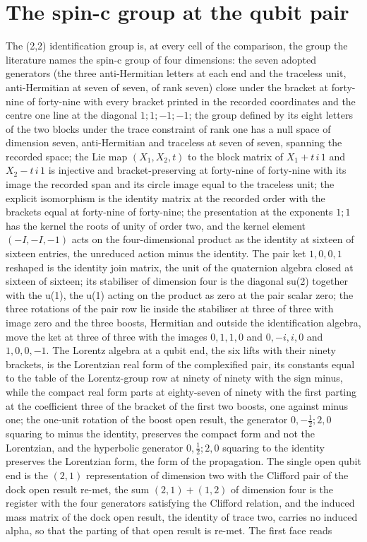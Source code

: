 \section{The spin-c group at the qubit pair}\label{mod:III-5-D542908-spcf-t1}
\begin{chtheorem}\label{box:III-5-D542908-spcf-t1:1}
The (2,2) identification group is, at every cell of the comparison, the group the literature names the spin-c group of four dimensions: the seven adopted generators (the three anti-Hermitian letters at each end and the traceless unit, anti-Hermitian at seven of seven, of rank seven) close under the bracket at forty-nine of forty-nine with every bracket printed in the recorded coordinates and the centre one line at the diagonal $1;1;-1;-1$; the group defined by its eight letters of the two blocks under the trace constraint of rank one has a null space of dimension seven, anti-Hermitian and traceless at seven of seven, spanning the recorded space; the Lie map $(X_{1}, X_{2}, t)$ to the block matrix of $X_{1} + t\,i\,1$ and $X_{2} - t\,i\,1$ is injective and bracket-preserving at forty-nine of forty-nine with its image the recorded span and its circle image equal to the traceless unit; the explicit isomorphism is the identity matrix at the recorded order with the brackets equal at forty-nine of forty-nine; the presentation at the exponents $1;1$ has the kernel the roots of unity of order two, and the kernel element $(-I, -I, -1)$ acts on the four-dimensional product as the identity at sixteen of sixteen entries, the unreduced action minus the identity. The pair ket $1,0,0,1$ reshaped is the identity join matrix, the unit of the quaternion algebra closed at sixteen of sixteen; its stabiliser of dimension four is the diagonal su(2) together with the u(1), the u(1) acting on the product as zero at the pair scalar zero; the three rotations of the pair row lie inside the stabiliser at three of three with image zero and the three boosts, Hermitian and outside the identification algebra, move the ket at three of three with the images $0,1,1,0$ and $0,-i,i,0$ and $1,0,0,-1$. The Lorentz algebra at a qubit end, the six lifts with their ninety brackets, is the Lorentzian real form of the complexified pair, its constants equal to the table of the Lorentz-group row at ninety of ninety with the sign minus, while the compact real form parts at eighty-seven of ninety with the first parting at the coefficient three of the bracket of the first two boosts, one against minus one; the one-unit rotation of the boost open result, the generator $0,-\tfrac{1}{2};2,0$ squaring to minus the identity, preserves the compact form and not the Lorentzian, and the hyperbolic generator $0,\tfrac{1}{2};2,0$ squaring to the identity preserves the Lorentzian form, the form of the propagation. The single open qubit end is the $(2,1)$ representation of dimension two with the Clifford pair of the dock open result re-met, the sum $(2,1)+(1,2)$ of dimension four is the register with the four generators satisfying the Clifford relation, and the induced mass matrix of the dock open result, the identity of trace two, carries no induced alpha, so that the parting of that open result is re-met. The first face reads 
\end{chtheorem}
